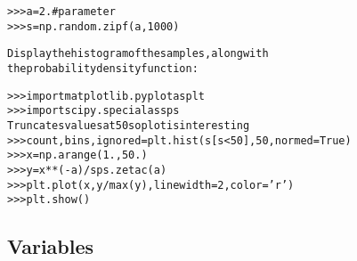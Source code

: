 \begin{boxedminipage}{\funcwidth}
\begin{alltt}
{\textgreater}{\textgreater}{\textgreater} a = 2. \# parameter
{\textgreater}{\textgreater}{\textgreater} s = np.random.zipf(a, 1000)

Display the histogram of the samples, along with
the probability density function:

{\textgreater}{\textgreater}{\textgreater} import matplotlib.pyplot as plt
{\textgreater}{\textgreater}{\textgreater} import scipy.special as sps
Truncate s values at 50 so plot is interesting
{\textgreater}{\textgreater}{\textgreater} count, bins, ignored = plt.hist(s[s{\textless}50], 50, normed=True)
{\textgreater}{\textgreater}{\textgreater} x = np.arange(1., 50.)
{\textgreater}{\textgreater}{\textgreater} y = x**(-a)/sps.zetac(a)
{\textgreater}{\textgreater}{\textgreater} plt.plot(x, y/max(y), linewidth=2, color='r')
{\textgreater}{\textgreater}{\textgreater} plt.show()
\end{alltt}

\setlength{\parskip}{1ex}
    \end{boxedminipage}



  \subsection{Variables}

